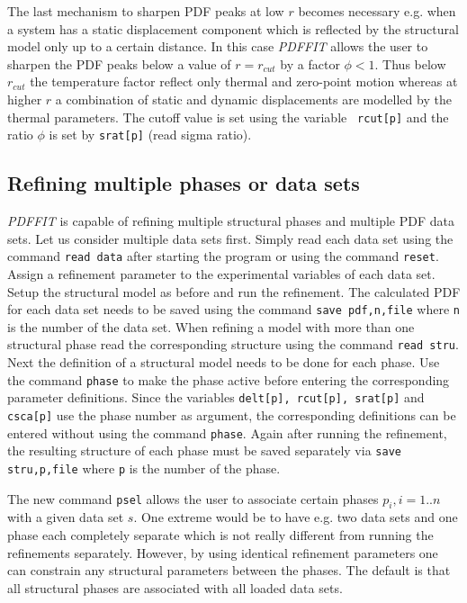 The last mechanism to sharpen PDF peaks at low $r$ becomes
necessary e.g. when a system has a static displacement component
which is reflected by the structural model only up to a certain
distance. In this case {\it PDFFIT} allows the user to sharpen the
PDF peaks below a value of $r=r_{cut}$ by a factor $\phi < 1$.
Thus below $r_{cut}$ the temperature factor reflect only thermal
and zero-point motion whereas at higher $r$ a combination of
static and dynamic displacements are modelled by the thermal
parameters. The cutoff value is set using the variable {\tt
rcut[p]} and the ratio $\phi$ is set by {\tt srat[p]} (read sigma
ratio).

\subsection{Refining multiple phases or data sets \label{fit_mult}}

{\it PDFFIT} is capable of refining multiple structural phases and
multiple PDF data sets. Let us consider multiple data sets first.
Simply read each data set using the command {\tt read data} after
starting the program or using the command {\tt reset}. Assign a
refinement parameter to the experimental variables of each data set.
Setup the structural model as before and run the refinement. The
calculated PDF for each data set needs to be saved using the
command {\tt save pdf,n,file} where {\tt n} is the number of the
data set. When refining a model with more than one structural phase
read the corresponding structure using the command {\tt read stru}. Next
the definition of a structural model needs to be done for each phase.
Use the command {\tt phase} to make the phase active before entering
the corresponding parameter definitions. Since the variables
{\tt delt[p], rcut[p], srat[p]} and {\tt csca[p]} use the phase
number as argument, the corresponding definitions can be entered
without using the command {\tt phase}. Again after running the
refinement, the resulting structure of each phase must be saved
separately via {\tt save stru,p,file} where {\tt p} is the number of
the phase. \par

The new command {\tt psel} allows the user to associate certain phases
$p_{i}, i=1..n$ with a given data set $s$. One extreme would be to have
e.g. two data sets and one phase each completely separate which is
not really different from running the refinements separately.
However, by using identical refinement parameters one can constrain
any structural parameters between the phases. The default is that all
structural phases are associated with all loaded data sets.
\par

